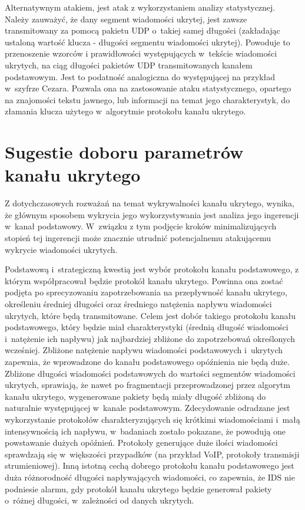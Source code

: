 \documentclass[a4paper, twoside, 12pt]{report}
\begin{document}
       Alternatywnym atakiem, jest atak z wykorzystaniem analizy statystycznej.
       Należy zauważyć, że dany segment wiadomości ukrytej, jest zawsze transmitowany
       za pomocą pakietu UDP o~takiej samej długości (zakładając ustaloną wartość klucza -
       długości segmentu wiadomości ukrytej). Powoduje to przenoszenie wzorców i
       prawidłowości występujących w~tekście wiadomości ukrytych, na ciąg długości
       pakietów UDP transmitowanych kanałem podstawowym. Jest to podatność analogiczna
       do występującej na przykład w~szyfrze Cezara. Pozwala ona na zastosowanie
       ataku statystycznego, opartego na znajomości tekstu jawnego, lub informacji
       na temat jego charakterystyk, do złamania klucza użytego w~algorytmie protokołu
       kanału ukrytego.

    \section{Sugestie doboru parametrów kanału ukrytego} \label{SUGESTIEPARAMETROW}
       Z dotychczasowych rozważań na temat wykrywalności kanału ukrytego, wynika,
       że głównym sposobem wykrycia jego wykorzystywania jest analiza jego ingerencji
       w~kanał podstawowy. W~związku z tym podjęcie kroków minimalizujących stopień
       tej ingerencji może znacznie utrudnić potencjalnemu atakującemu wykrycie
       wiadomości ukrytych.

       Podstawową i~strategiczną kwestią jest wybór protokołu kanału podstawowego,
       z którym współpracował będzie protokół kanału ukrytego. Powinna ona zostać
       podjęta po sprecyzowaniu zapotrzebowania na przepływność kanału ukrytego,
       określeniu średniej długości oraz średniego natężenia napływu wiadomości
       ukrytych, które będą transmitowane. Celem jest dobór takiego protokołu
       kanału podstawowego, który będzie miał charakterystyki (średnią długość wiadomości
       i~natężenie ich napływu) jak najbardziej zbliżone do zapotrzebowań określonych
       wcześniej. Zbliżone natężenie napływu wiadomości podstawowych i~ukrytych zapewnia,
       że wprowadzone do kanału podstawowego opóźnienia nie będą duże.
       Zbliżone długości wiadomości podstawowych do wartości segmentów wiadomości ukrytych,
       sprawiają, że nawet po fragmentacji przeprowadzonej przez algorytm kanału ukrytego,
       wygenerowane pakiety będą miały długość zbliżoną do naturalnie występującej
       w~kanale podstawowym. Zdecydowanie odradzane jest wykorzystanie protokołów
       charakteryzujących się krótkimi wiadomościami i~małą intensywnością ich napływu,
       w~badaniach zostało pokazane, że powodują one powstawanie dużych opóźnień.
       Protokoły generujące duże ilości wiadomości sprawdzają się w~większości
       przypadków (na przykład VoIP, protokoły transmisji strumieniowej).
       Inną istotną cechą dobrego protokołu kanału podstawowego jest duża różnorodność
       długości napływających wiadomości, co zapewnia, że IDS nie podniesie alarmu,
       gdy protokół kanału ukrytego będzie generował pakiety o~różnej długości,
       w~zależności od danych ukrytych.
\end{document}
